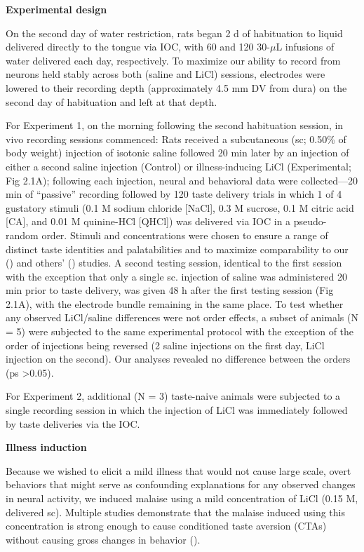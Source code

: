 \begin{refsection}
\smallskip
\noindent\textbf{Experimental design}\par
\noindent 
On the second day of water restriction, rats began 2 d of habituation to liquid delivered directly to the tongue via IOC, with 60 and 120 30-\(\mu\)L infusions of water delivered each day, respectively. To maximize our ability to record from neurons held stably across both (saline and LiCl) sessions, electrodes were lowered to their recording depth (approximately 4.5 mm DV from dura) on the second day of habituation and left at that depth.

For Experiment 1, on the morning following the second habituation session, in vivo recording sessions commenced: Rats received a subcutaneous (sc; 0.50\% of body weight) injection of isotonic saline followed 20 min later by an injection of either a second saline injection (Control) or illness-inducing LiCl (Experimental; Fig 2.1A); following each injection, neural and behavioral data were collected—20 min of “passive” recording followed by 120 taste delivery trials in which 1 of 4 gustatory stimuli (0.1 M sodium chloride [NaCl], 0.3 M sucrose, 0.1 M citric acid [CA], and 0.01 M quinine-HCl [QHCl]) was delivered via IOC in a pseudo-random order. Stimuli and concentrations were chosen to ensure a range of distinct taste identities and palatabilities and to maximize comparability to our (\cite{grossman2008a,levitan2019a,moran2014a,sadacca2012a}) and others’ (\cite{spector1988a,samuelsen2012a}) studies. A second testing session, identical to the first session with the exception that only a single sc. injection of saline was administered 20 min prior to taste delivery, was given 48 h after the first testing session (Fig 2.1A), with the electrode bundle remaining in the same place. To test whether any observed LiCl/saline differences were not order effects, a subset of animals (N = 5) were subjected to the same experimental protocol with the exception of the order of injections being reversed (2 saline injections on the first day, LiCl injection on the second). Our analyses revealed no difference between the orders (ps \textgreater 0.05).

For Experiment 2, additional (N = 3) taste-naive animals were subjected to a single recording session in which the injection of LiCl was immediately followed by taste deliveries via the IOC.

\smallskip
\noindent\textbf{Illness induction}\par
\noindent 
Because we wished to elicit a mild illness that would not cause large scale, overt behaviors that might serve as confounding explanations for any observed changes in neural activity, we induced malaise using a mild concentration of LiCl (0.15 M, delivered sc). Multiple studies demonstrate that the malaise induced using this concentration is strong enough to cause conditioned taste aversion (CTAs) without causing gross changes in behavior (\cite{nachman1973a,smith1971a}).


\end{refsection}
